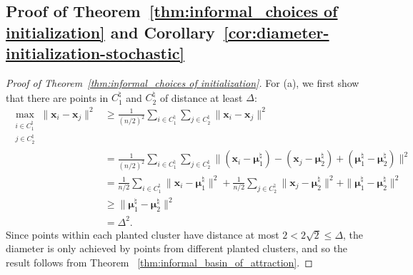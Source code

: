 \documentclass{article}
\theoremstyle{plain}
\theoremstyle{definition}
\newcommand{\1}{\mathbf{1}}
\newcommand{\hmu}{\bm{\mu}^\natural}
\begin{document}
\subsection{Proof of Theorem~\ref{thm:informal_choices of initialization} and Corollary~\ref{cor:diameter-initialization-stochastic}}
\label{sec:initialization}

\begin{proof}[Proof of Theorem~\ref{thm:informal_choices of initialization}]
For (a), we first show that there are points in $C^\natural_1$ and $C^\natural_2$ of distance at least $\Delta$:
\begin{align*}
\max_{\substack{i\in C^\natural_1\\j\in C^\natural_2}}\|\bm{x}_i-\bm{x}_j\|^2
&\geq\frac{1}{(n/2)^2}\sum_{i\in C^\natural_1}\sum_{j\in C^\natural_2}\|\bm{x}_i-\bm{x}_j\|^2\\
&=\frac{1}{(n/2)^2}\sum_{i\in C^\natural_1}\sum_{j\in C^\natural_2}\|(\bm{x}_i-\hmu_1)-(\bm{x}_j-\hmu_2)+(\hmu_1-\hmu_2)\|^2\\
&=\frac{1}{n/2}\sum_{i\in C^\natural_1}\|\bm{x}_i-\hmu_1\|^2+\frac{1}{n/2}\sum_{j\in C^\natural_2}\|\bm{x}_j-\hmu_2\|^2+\|\hmu_1-\hmu_2\|^2\\
&\geq\|\hmu_1-\hmu_2\|^2\\[1em]
&=\Delta^2.
\end{align*}
Since points within each planted cluster have distance at most $2<2\sqrt{2}\leq\Delta$, the diameter is only achieved by points from different planted clusters, and so the result follows from Theorem ~\ref{thm:informal_basin_of_attraction}.


\end{proof}
\end{document}
